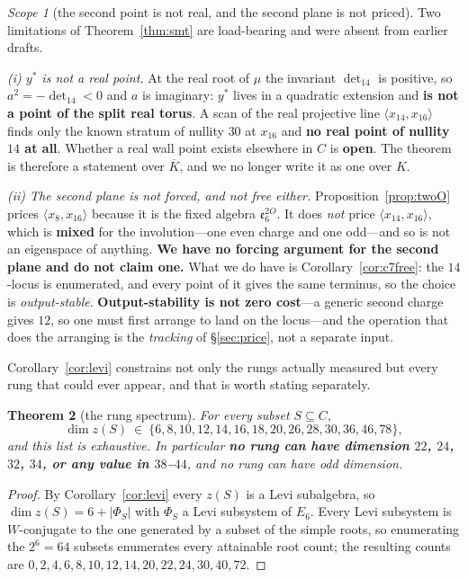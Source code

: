 \documentclass[11pt,reqno]{amsart}
\theoremstyle{plain}
\newtheorem{theorem}{Theorem}[section]
\theoremstyle{definition}
\theoremstyle{remark}
\newtheorem{scope}[theorem]{Scope}
\newcommand{\ee}{\mathfrak{e}}
\begin{document}
\begin{scope}[the second point is not real, and the second plane is not priced]\label{sc:ystar}
Two limitations of Theorem~\ref{thm:smt} are load-bearing and were absent from earlier
drafts.

\emph{(i) $y^*$ is not a real point.} At the real root of $\mu$ the invariant
$\det_{14}$ is positive, so $a^2=-\det_{14}<0$ and $a$ is imaginary: $y^*$ lives in a
quadratic extension and \textbf{is not a point of the split real torus}. A scan of the
real projective line $\langle x_{14},x_{16}\rangle$ finds only the known stratum of
nullity $30$ at $x_{16}$ and \textbf{no real point of nullity $14$ at all}. Whether a
real wall point exists elsewhere in $C$ is \textbf{open}. The theorem is therefore a
statement over $\overline K$, and we no longer write it as one over $K$.

\emph{(ii) The second plane is not forced, and not free either.}
Proposition~\ref{prop:twoO} prices $\langle x_8,x_{16}\rangle$ because it is the fixed
algebra $\ee_6^{2O}$. It does \emph{not} price $\langle x_{14},x_{16}\rangle$, which is
\textbf{mixed} for the involution---one even charge and one odd---and so is not an
eigenspace of anything. \textbf{We have no forcing argument for the second plane and do
not claim one.} What we do have is Corollary~\ref{cor:c7free}: the $14$-locus is
enumerated, and every point of it gives the same terminus, so the choice is
\emph{output-stable}. \textbf{Output-stability is not zero cost}---a generic second
charge gives $12$, so one must first arrange to land on the locus---and the operation
that does the arranging is the \emph{tracking} of \S\ref{sec:price}, not a separate
input.
\end{scope}

Corollary~\ref{cor:levi} constrains not only the rungs actually measured but every rung
that could ever appear, and that is worth stating separately.

\begin{theorem}[the rung spectrum]\label{thm:rungspec}
For every subset $S\subseteq C$,
\[
   \dim z(S)\ \in\ \{6,8,10,12,14,16,18,20,26,28,30,36,46,78\},
\]
and this list is exhaustive. In particular \textbf{no rung can have dimension $22$, $24$,
$32$, $34$, or any value in $38$--$44$}, and no rung can have odd dimension.
\end{theorem}

\begin{proof}
By Corollary~\ref{cor:levi} every $z(S)$ is a Levi subalgebra, so $\dim z(S)=6+\lvert
\Phi_S\rvert$ with $\Phi_S$ a Levi subsystem of $E_6$. Every Levi subsystem is
$W$-conjugate to the one generated by a subset of the simple roots, so enumerating the
$2^6=64$ subsets enumerates every attainable root count; the resulting counts are
$0,2,4,6,8,10,12,14,20,22,24,30,40,72$.
\end{proof}
\end{document}
